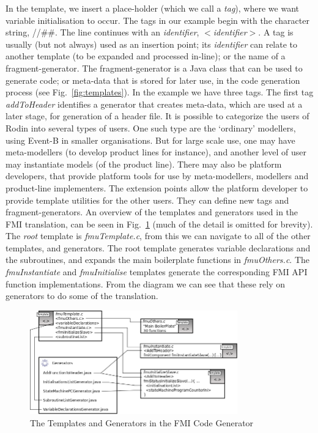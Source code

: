 \documentclass{llncs}%
\begin{document}
In the template, we insert a place-holder (which we call a \emph{tag}), where we want variable initialisation to occur. The tags in our example begin with the character string, //\#\#.  The line continues with an \emph{identifier}, $<$\emph{identifier}$>$. A tag is usually (but not always) used as an insertion point; its \emph{identifier} can relate to another template (to be expanded and processed in-line); or the name of a fragment-generator. The fragment-generator is a Java class that can be used to generate code; or meta-data that is stored for later use, in the code generation process  (see Fig.~\ref{fig:templates}). In the example we have three tags. The first tag \emph{addToHeader} identifies a generator that creates meta-data, which are used at a later stage, for generation of a header file. It is possible to categorize the users of Rodin into several types of users. One such type are the `ordinary' modellers, using Event-B in smaller organisations. But for large scale use, one may have meta-modellers (to develop product lines for instance), and another level of user may instantiate models (of the product line). There may also be platform developers, that provide platform tools for use by meta-modellers, modellers and product-line implementers. The extension points allow the platform developer to provide template utilities for the other users. They can define new tags and fragment-generators.
An overview of the  templates and generators used in the FMI translation, can be seen in Fig.~\ref{fig:templateStructure} (much of the detail is omitted for brevity). The \emph{root} template is \emph{fmuTemplate.c}, from this we can navigate to all of the other templates, and generators. The root template generates variable declarations and the subroutines, and expands the main boilerplate functions in \emph{fmuOthers.c}. The \emph{fmuInstantiate} and \emph{fmuInitialise} templates generate the corresponding FMI API function implementations. From the diagram we can see that these rely on generators to do some of the translation.
%
\begin{figure}
\centering
\includegraphics[width=0.8\textwidth]{templateStructure.png}
\caption{The Templates and Generators in the FMI Code Generator}
\label{fig:templateStructure}
\end{figure}
\end{document}
